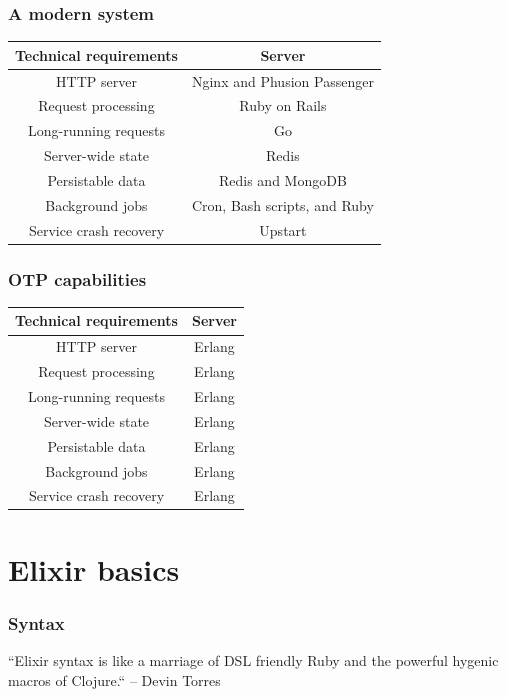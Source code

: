 \documentclass{beamer}
\begin{document}
\begin{frame}
  \frametitle{A modern system}
  \begin{center}
    \begin{tabular}{c|c}
      \hline
      Technical requirements & Server \\ \hline
      HTTP server & Nginx and Phusion Passenger \\
      Request processing & Ruby on Rails \\
      Long-running requests & Go \\
      Server-wide state & Redis \\
      Persistable data & Redis and MongoDB \\
      Background jobs & Cron, Bash scripts, and Ruby \\
      Service crash recovery & Upstart \\
      \hline
    \end{tabular}
  \end{center}
\end{frame}

\begin{frame}
  \frametitle{OTP capabilities}
  \begin{center}
    \begin{tabular}{c|c}
      \hline
      Technical requirements & Server \\ \hline
      HTTP server & Erlang \\
      Request processing & Erlang \\
      Long-running requests & Erlang \\
      Server-wide state & Erlang \\
      Persistable data & Erlang \\
      Background jobs & Erlang \\
      Service crash recovery & Erlang \\
      \hline
    \end{tabular}
  \end{center}
\end{frame}

\section[Section]{Elixir basics}

\begin{frame}
  \frametitle{Syntax}
  ``Elixir syntax is like a marriage of DSL
  friendly Ruby and the powerful hygenic macros of Clojure.``
  \linebreak
  \textrm{-- Devin Torres}
\end{frame}
\end{document}
